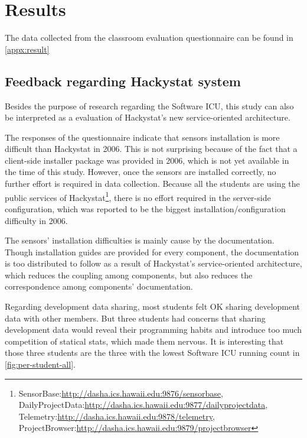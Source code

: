 \chapter {Results}

The data collected from the classroom evaluation questionnaire can be found in \autoref{appx:result}

\section {Feedback regarding Hackystat system}
Besides the purpose of research regarding the Software ICU, this study can also be interpreted as a evaluation of Hackystat's new service-oriented architecture.

The responses of the questionnaire indicate that sensors installation is more difficult than Hackystat in 2006. This is not surprising because of the fact that a client-side installer package was provided in 2006, which is not yet available in the time of this study. However, once the sensors are installed correctly, no further effort is required in data collection. Because all the students are using the public services of Hackystat\footnote{SensorBase:\url{http://dasha.ics.hawaii.edu:9876/sensorbase},\\ DailyProjectData:\url{http://dasha.ics.hawaii.edu:9877/dailyprojectdata},\\ Telemetry:\url{http://dasha.ics.hawaii.edu:9878/telemetry},\\ ProjectBrowser:\url{http://dasha.ics.hawaii.edu:9879/projectbrowser}}, there is no effort required in the server-side configuration, which was reported to be the biggest installation/configuration difficulty in 2006.

The sensors' installation difficulties is mainly cause by the documentation. Though installation guides are provided for every component, the documentation is too distributed to follow as a result of Hackystat's service-oriented architecture, which reduces the coupling among components, but also reduces the correspondence among components' documentation.

Regarding development data sharing, most students felt OK sharing development data with other members. But three students had concerns that sharing development data would reveal their programming habits and introduce too much competition of statical stats, which made them nervous. It is interesting that those three students are the three with the lowest Software ICU running count in \autoref{fig:per-student-all}. %

